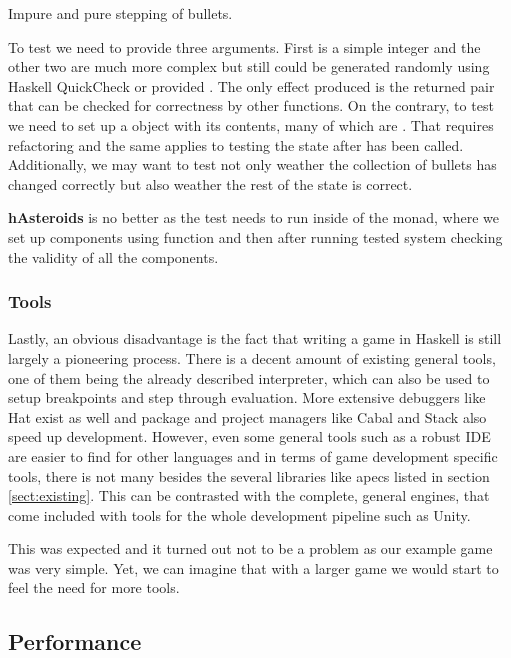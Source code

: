 \documentclass[
  digital, %
  color,   %
  table,   %
  oneside, %
  lof,     %
  lot,     %
]{fithesis3}
\begin{document}
{\begin{listing}
\caption{Impure and pure stepping of bullets.}
\label{lst:testingexamp}
\end{listing}
To test  we need to provide three arguments. First is a simple
integer and the other two are much more complex but still could be generated randomly using
Haskell QuickCheck or provided . The only effect produced is the returned
pair that can be checked for correctness by other functions. On the contrary, to test
 we need to set up a  object with its contents,
many of which are . That requires refactoring and
the same applies to testing the state after  has been called.
Additionally, we may want to test not only weather the collection of bullets has
changed correctly but also weather the rest of the state is correct.

\textbf{hAsteroids} is no better as the test needs to run inside of the  monad,
where we set up components using  function and then after running
tested system checking the validity of all the components.

\subsubsection{Tools}
Lastly, an obvious disadvantage is the fact that writing a game in Haskell
is still largely a pioneering process. There is a decent amount of existing general tools,
one of them being the already described interpreter,
which can also be used to setup breakpoints and step through evaluation.
More extensive debuggers like Hat exist as well and package and project managers like Cabal
and Stack also speed up development. However, even some general tools such as a robust IDE
are easier to find for other languages and in terms of game development specific tools,
there is not many besides the several libraries like apecs listed in section \ref{sect:existing}.
This can be contrasted with the complete, general engines, that come included with 
tools for the whole development pipeline such as Unity.

This was expected and it turned out not to be a problem as our example game was
very simple. Yet, we can imagine that with a larger game we would start
to feel the need for more tools.



\subsection{Performance}

}
\end{document}
